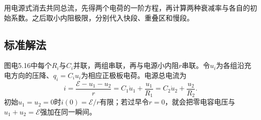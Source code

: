 \documentclass[UTF8,fontset=fandol,a4paper,11pt]{ctexart}
\begin{document}
用电源式消去共同总流，先得两个电荷的一阶方程，再计算两种衰减率与各自的初始系数。之后取小内阻极限，分别代入快段、重叠区和慢段。


\subsection*{标准解法}


图电5.16中每个$R_i$与$C_i$并联，两组串联，再与电源小内阻$r$串联。令$u_i$为各组沿充电方向的压降、$q_i=C_iu_i$为相应正极板电荷。电源总电流为
\[
 i=\frac{\mathcal E-u_1-u_2}{r}
 =C_1\dot u_1+\frac{u_1}{R_1}
 =C_2\dot u_2+\frac{u_2}{R_2}.
\]
初始$u_1=u_2=0$时$i(0)=\mathcal E/r$有限；若过早令$r=0$，就会把零电容电压与$u_1+u_2=\mathcal E$强加在同一瞬间。
\end{document}
